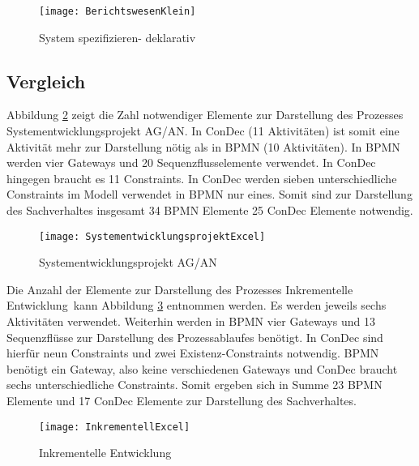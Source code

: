 {\begin{figure}[!htbp]
\begin{center}
  \texttt{[image: BerichtswesenKlein]} %
  \caption{System spezifizieren- deklarativ}
  \label{fig:BerichtswesenKlein}
\end{center}
\end{figure}

\clearpage

\subsection{Vergleich}


Abbildung \ref{fig:SystementwicklungsprojektExcel} zeigt die Zahl notwendiger Elemente zur Darstellung des Prozesses \grqq Systementwicklungsprojekt AG/AN\grqq. In ConDec (11 Aktivitäten) ist somit eine Aktivität mehr zur Darstellung nötig als in BPMN (10 Aktivitäten). In BPMN werden vier Gateways und 20 Sequenzflusselemente verwendet. In ConDec hingegen braucht es 11 Constraints. In ConDec werden sieben unterschiedliche Constraints im Modell verwendet in BPMN nur eines. Somit sind zur Darstellung des Sachverhaltes insgesamt 34 BPMN Elemente 25 ConDec Elemente notwendig.\newline

\begin{figure}[!htbp]
\begin{center}
  \texttt{[image: SystementwicklungsprojektExcel]} %
  \caption{Systementwicklungsprojekt AG/AN}
  \label{fig:SystementwicklungsprojektExcel}
\end{center}
\end{figure}

Die Anzahl der Elemente zur Darstellung des Prozesses \grqq Inkrementelle Entwicklung\grqq \ kann Abbildung \ref{fig:InkrementellExcel} entnommen werden. Es werden jeweils sechs Aktivitäten verwendet. Weiterhin werden in BPMN vier Gateways und 13 Sequenzflüsse zur Darstellung des Prozessablaufes benötigt. In ConDec sind hierfür neun Constraints und zwei Existenz-Constraints notwendig. BPMN benötigt ein Gateway, also keine verschiedenen Gateways und ConDec braucht sechs unterschiedliche Constraints. Somit ergeben sich in Summe 23 BPMN Elemente und 17 ConDec Elemente zur Darstellung des Sachverhaltes. \newline

\begin{figure}[!htbp]
\begin{center}
  \texttt{[image: InkrementellExcel]} %
  \caption{Inkrementelle Entwicklung}
  \label{fig:InkrementellExcel}
\end{center}
\end{figure}

}
